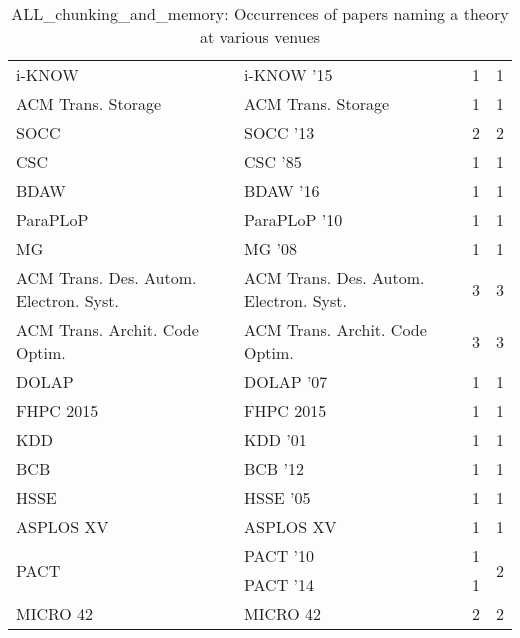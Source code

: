 \begin{table*}[t]
\begin{tabular}{llrr}
\multirow{1}{*}{i-KNOW } & i-KNOW '15 & 1 & \multirow{1}{*}{1}\\
\multirow{1}{*}{ACM Trans. Storage} & ACM Trans. Storage & 1 & \multirow{1}{*}{1}\\
\multirow{1}{*}{SOCC } & SOCC '13 & 2 & \multirow{1}{*}{2}\\
\multirow{1}{*}{CSC } & CSC '85 & 1 & \multirow{1}{*}{1}\\
\multirow{1}{*}{BDAW } & BDAW '16 & 1 & \multirow{1}{*}{1}\\
\multirow{1}{*}{ParaPLoP } & ParaPLoP '10 & 1 & \multirow{1}{*}{1}\\
\multirow{1}{*}{MG } & MG '08 & 1 & \multirow{1}{*}{1}\\
\multirow{1}{*}{ACM Trans. Des. Autom. Electron. Syst.} & ACM Trans. Des. Autom. Electron. Syst. & 3 & \multirow{1}{*}{3}\\
\multirow{1}{*}{ACM Trans. Archit. Code Optim.} & ACM Trans. Archit. Code Optim. & 3 & \multirow{1}{*}{3}\\
\multirow{1}{*}{DOLAP } & DOLAP '07 & 1 & \multirow{1}{*}{1}\\
\multirow{1}{*}{FHPC 2015} & FHPC 2015 & 1 & \multirow{1}{*}{1}\\
\multirow{1}{*}{KDD } & KDD '01 & 1 & \multirow{1}{*}{1}\\
\multirow{1}{*}{BCB } & BCB '12 & 1 & \multirow{1}{*}{1}\\
\multirow{1}{*}{HSSE } & HSSE '05 & 1 & \multirow{1}{*}{1}\\
\multirow{1}{*}{ASPLOS XV} & ASPLOS XV & 1 & \multirow{1}{*}{1}\\
\multirow{2}{*}{PACT } & PACT '10 & 1 & \multirow{2}{*}{2}\\
& PACT '14 & 1 &\\
\multirow{1}{*}{MICRO 42} & MICRO 42 & 2 & \multirow{1}{*}{2}\\
\end{tabular}
\caption{ALL\_chunking\_and\_memory: Occurrences of papers naming a theory at various venues}
\end{table*}